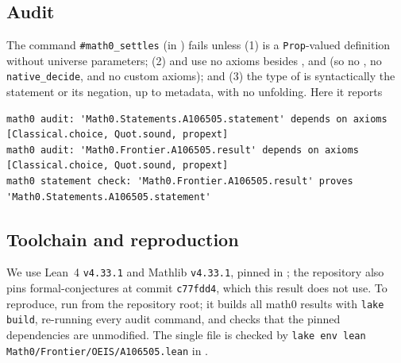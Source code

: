 \documentclass[11pt]{amsart}
\theoremstyle{plain}
\theoremstyle{definition}
\begin{document}
\subsection*{Audit}
The command \texttt{\#math0\_settles} (in ) fails unless (1)  is a \texttt{Prop}-valued definition without universe parameters; (2)  and  use no axioms besides ,  and  (so no , no \texttt{native\_decide}, and no custom axioms); and (3) the type of  is syntactically the statement or its negation, up to metadata, with no unfolding. Here it reports
\begin{lstlisting}[basicstyle=\ttfamily\scriptsize]
math0 audit: 'Math0.Statements.A106505.statement' depends on axioms [Classical.choice, Quot.sound, propext]
math0 audit: 'Math0.Frontier.A106505.result' depends on axioms [Classical.choice, Quot.sound, propext]
math0 statement check: 'Math0.Frontier.A106505.result' proves 'Math0.Statements.A106505.statement'
\end{lstlisting}

\subsection*{Toolchain and reproduction}
We use Lean~4 \cite{Lean4} \texttt{v4.33.1} and Mathlib \cite{Mathlib} \texttt{v4.33.1}, pinned in ; the repository also pins formal-conjectures \cite{FC} at commit \texttt{c77fdd4}, which this result does not use. To reproduce, run  from the repository root; it builds all math0 results with \texttt{lake build}, re-running every audit command, and checks that the pinned dependencies are unmodified. The single file is checked by \texttt{lake env lean Math0/Frontier/OEIS/A106505.lean} in .
\end{document}
